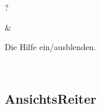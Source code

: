 \documentclass[letterpaper,10pt,german]{sphinxmanual}
\begin{document}
\begin{savenotes}
\begin{tabular}[t]{}
\sphinxhline\begin{varwidth}[t]{}
\sphinxAtStartPar
?
\sphinxbeforeendvarwidth
\end{varwidth}%
&\begin{varwidth}[t]{}
\sphinxAtStartPar
Die Hilfe ein\sphinxhyphen{}/ausblenden.
\sphinxbeforeendvarwidth
\end{varwidth}%
\\
\sphinxbottomrule
\end{tabular}
\sphinxtableafterendhook\par
\sphinxattableend\end{savenotes}


\subsection{Ansichts\sphinxhyphen{}Reiter}
\label{\detokenize{raccourcis:onglets-de-vues}}\label{\detokenize{raccourcis:raccourcis-vues}}
\end{document}
